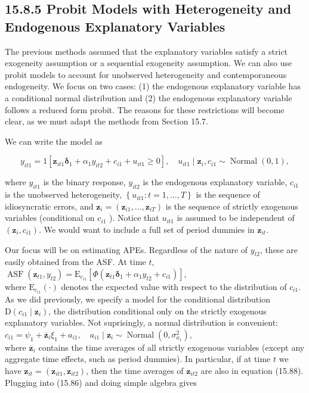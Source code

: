 \documentclass[10pt]{article}
\begin{document}
\subsection*{15.8.5 Probit Models with Heterogeneity and Endogenous Explanatory Variables}
The previous methods assumed that the explanatory variables satisfy a strict exogeneity assumption or a sequential exogeneity assumption. We can also use probit models to account for unobserved heterogeneity and contemporaneous endogeneity. We focus on two cases: (1) the endogenous explanatory variable has a conditional normal distribution and (2) the endogenous explanatory variable follows a reduced form probit. The reasons for these restrictions will become clear, as we must adapt the methods from Section 15.7.

We can write the model as


\begin{equation*}
y_{i t 1}=1\left[\mathbf{z}_{i t 1} \boldsymbol{\delta}_{1}+\alpha_{1} y_{i t 2}+c_{i 1}+u_{i t 1} \geq 0\right], \quad u_{i t 1} \mid \mathbf{z}_{i}, c_{i 1} \sim \operatorname{Normal}(0,1), \tag{15.86}
\end{equation*}


where $y_{i t 1}$ is the binary response, $y_{i t 2}$ is the endogenous explanatory variable, $c_{i 1}$ is the unobserved heterogeneity, $\left\{u_{i t 1}: t=1, \ldots, T\right\}$ is the sequence of idiosyncratic errors, and $\mathbf{z}_{i}=\left(\mathbf{z}_{i 1}, \ldots, \mathbf{z}_{i T}\right)$ is the sequence of strictly exogenous variables (conditional on $c_{i 1}$ ). Notice that $u_{i t 1}$ is assumed to be independent of $\left(\mathbf{z}_{i}, c_{i 1}\right)$. We would want to include a full set of period dummies in $\mathbf{z}_{i t}$.

Our focus will be on estimating APEs. Regardless of the nature of $y_{t 2}$, these are easily obtained from the ASF. At time $t$,\\
$\operatorname{ASF}\left(\mathbf{z}_{t 1}, y_{t 2}\right)=\mathrm{E}_{c_{i 1}}\left[\Phi\left(\mathbf{z}_{t 1} \boldsymbol{\delta}_{1}+\alpha_{1} y_{t 2}+c_{i 1}\right)\right]$,\\
where $\mathrm{E}_{c_{i 1}}(\cdot)$ denotes the expected value with respect to the distribution of $c_{i 1}$. As we did previously, we specify a model for the conditional distribution $\mathrm{D}\left(c_{i 1} \mid \mathbf{z}_{i}\right)$, the distribution conditional only on the strictly exogenous explanatory variables. Not suprisingly, a normal distribution is convenient:\\
$c_{i 1}=\psi_{1}+\overline{\mathbf{z}}_{i} \xi_{1}+a_{i 1}, \quad a_{i 1} \mid \mathbf{z}_{i} \sim \operatorname{Normal}\left(0, \sigma_{a_{1}}^{2}\right)$,\\
where $\overline{\mathbf{z}}_{i}$ contains the time averages of all strictly exogenous variables (except any aggregate time effects, such as period dummies). In particular, if at time $t$ we have $\mathbf{z}_{i t}=\left(\mathbf{z}_{i t 1}, \mathbf{z}_{i t 2}\right)$, then the time averages of $\mathbf{z}_{i t 2}$ are also in equation (15.88). Plugging into (15.86) and doing simple algebra gives
\end{document}
